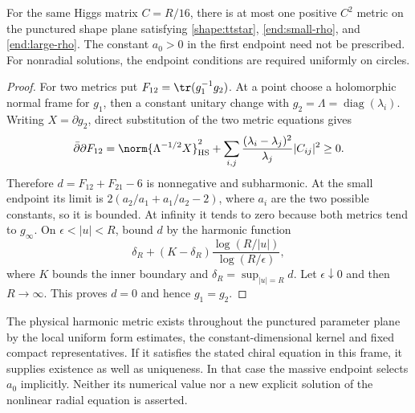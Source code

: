 \begin{theorem}\label{end:unique}
For the same Higgs matrix $C=R/16$, there is at most one positive
$C^2$ metric on the punctured shape plane satisfying
\eqref{shape:ttstar}, \eqref{end:small-rho}, and
\eqref{end:large-rho}. The constant $a_0>0$ in the first endpoint
need not be prescribed. For nonradial solutions, the endpoint
conditions are required uniformly on circles.
\end{theorem}
\begin{proof}
For two metrics put $F_{12}=\tr(g_1^{-1}g_2)$. At a point choose
a holomorphic normal frame for $g_1$, then a constant unitary
change with $g_2=\Lambda=\operatorname{diag}(\lambda_i)$.
Writing $X=\partial g_2$, direct substitution of the two metric
equations gives
\[
\bar\partial\partial F_{12}
 =\norm{\Lambda^{-1/2}X}_{\mathrm{HS}}^2
  +\sum_{i,j}\frac{(\lambda_i-\lambda_j)^2}{\lambda_j}|C_{ij}|^2
 \ge0.
\]
Therefore $d=F_{12}+F_{21}-6$ is nonnegative and subharmonic.
At the small endpoint its limit is
$2(a_2/a_1+a_1/a_2-2)$, where $a_i$ are the two possible constants,
so it is bounded. At infinity it tends to zero because both
metrics tend to $g_\infty$.
On $\epsilon<|u|<R$, bound $d$ by the harmonic function
\[
\delta_R+(K-\delta_R)
           \frac{\log(R/|u|)}{\log(R/\epsilon)},
\]
where $K$ bounds the inner boundary and
$\delta_R=\sup_{|u|=R}d$. Let $\epsilon\downarrow0$ and then
$R\to\infty$. This proves $d=0$ and hence $g_1=g_2$.
\end{proof}
The physical harmonic metric exists throughout the punctured
parameter plane by the local uniform form estimates, the
constant-dimensional kernel and fixed compact representatives.
If it satisfies the stated chiral equation in this frame, it
supplies existence as well as uniqueness. In that case the
massive endpoint selects $a_0$ implicitly. Neither its numerical
value nor a new explicit solution of the nonlinear radial equation
is asserted.
